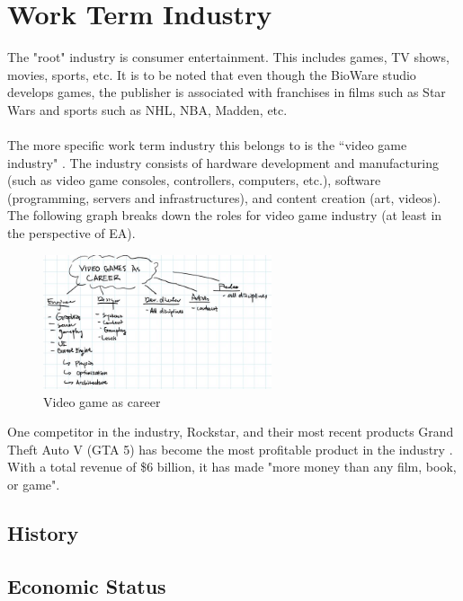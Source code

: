 \documentclass[10pt,letterpaper]{article}
\begin{document}
\section{Work Term Industry}\label{work-term-industry}

The "root" industry is consumer entertainment. This includes games, TV shows, movies, sports, etc. It is to be noted that even though the BioWare studio develops games, the publisher is associated with franchises in films such as Star Wars and sports such as NHL, NBA, Madden, etc.\\
\\
The more specific work term industry this belongs to is the ``video game industry" \cite{video-game-industry}. The industry consists of hardware development and manufacturing (such as video game consoles, controllers, computers, etc.), software (programming, servers and infrastructures), and content creation (art, videos). The following graph breaks down the roles for video game industry \cite{EA-intern-conf-2} (at least in the perspective of EA).

\begin{figure}[H]
	\centering
	\includegraphics[width=0.6\textwidth]{assets/video-games-career-roles}
	\caption{Video game as career}
\end{figure}

One competitor in the industry, Rockstar, and their most recent products Grand Theft Auto V (GTA 5) has become the most profitable product in the industry \cite{IGN-gta5}. With a total revenue of \$6 billion, it has made "more money than any film, book, or game".

\subsection{History}

\subsection{Economic Status}
\end{document}
